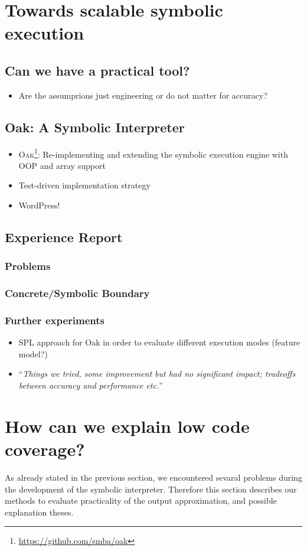 \documentclass[preprint]{sig-alternate-05-2015}
\begin{document}
\section{Towards scalable symbolic execution}
\subsection{Can we have a practical tool?}
\begin{itemize}
  \item Are the assumprions just engineering or do not matter for accuracy? 
\end{itemize}
\subsection{Oak: A Symbolic Interpreter}
\begin{itemize}
  \item \textsc{Oak}\footnote{\url{https://github.com/smba/oak}}:
  Re-implementing and extending the symbolic execution engine with OOP and array support
  \item Test-driven implementation strategy 
  \item WordPress!
\end{itemize}
\subsection{Experience Report}
\subsubsection{Problems}
\subsubsection{Concrete/Symbolic Boundary}
\subsubsection{Further experiments}
\begin{itemize}
  \item SPL approach for Oak in order to evaluate different execution modes
  (feature model?)
  \item ``\emph{Things we tried, some improvement but had no significant impact;
  tradeoffs between accuracy and performance etc.}''
\end{itemize}

\section{How can we explain low code coverage?}
As already stated in the previous section, we encountered sevaral problems
during the development of the symbolic interpreter. Therefore this section
describes our methods to evaluate practicality of the output approximation, and
possible explanation theses.
\end{document}
